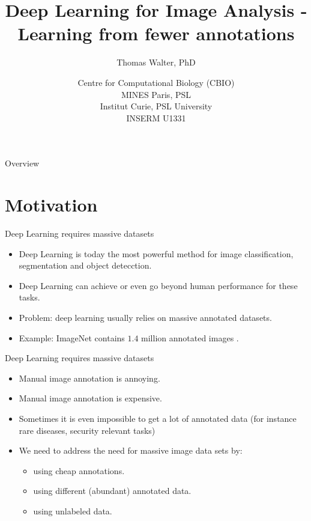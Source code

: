 \documentclass[xcolor=pdftex,dvipsnames,table]{beamer}
\title{Deep Learning for Image Analysis - \\
	   Learning from fewer annotations}
\author{Thomas Walter, PhD}
\date{Centre for Computational Biology (CBIO) \\
	  MINES Paris, PSL \\
	  Institut Curie, PSL University \\
	  INSERM U1331}
\begin{document}
\begin{frame}
\titlepage
\end{frame}

\begin{frame}{Overview}
\tableofcontents
\end{frame}

\section{Motivation}

\begin{frame}{Deep Learning requires massive datasets}
\begin{itemize}
	\item Deep Learning is today the most powerful method for image classification, segmentation and object detecction. 
   \item Deep Learning can achieve or even go beyond human performance for these tasks. 
   \item Problem: deep learning usually relies on massive annotated datasets.
   \item Example: ImageNet contains $1.4$ million annotated images \cite{ImageNet:2015}. 
\end{itemize}
\end{frame}

\begin{frame}{Deep Learning requires massive datasets}
\begin{itemize}
\item Manual image annotation is annoying.
\item Manual image annotation is expensive.
\item Sometimes it is even impossible to get a lot of annotated data (for instance rare diseases, security relevant tasks)
\item We need to address the need for massive image data sets by:
\begin{itemize}
   \item using cheap annotations.
   \item using different (abundant) annotated data.
   \item using unlabeled data.
\end{itemize}
\end{itemize}
\end{frame}
\end{document}
